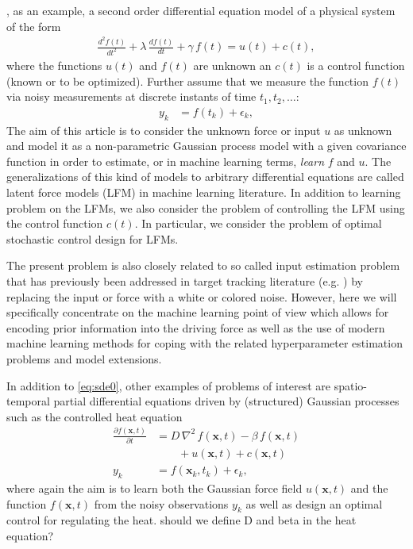 \documentclass[journal]{IEEEtran}
\newcommand{\mauricio}[1]{{\color{blue}#1}}
\begin{document}
, as an example, a second order differential equation model of a physical system of the form
%
\begin{equation}
\begin{split}
  \frac{d^{2}f(t)}{dt^{2}} + \lambda \, \frac{df(t)}{dt} + \gamma \, f(t) = u(t) + c(t),
\end{split}
\label{eq:sde0}
\end{equation}
%
where the functions $u(t)$ and $f(t)$ are unknown an $c(t)$ is a control function (known or to be optimized). Further assume that we measure the function $f(t)$ via noisy measurements at discrete instants of time $t_1,t_2,\ldots$:
%
\begin{equation}
\begin{split}
  y_k &= f(t_k) + \epsilon_k,
\end{split}
\end{equation}
%
The aim of this article is to consider the unknown force or input $u$ as unknown and model it as a non-parametric Gaussian process model \cite{Rasmussen+Williams:2006} with a given covariance function in order to estimate, or in machine learning terms, {\em learn} $f$ and $u$. The generalizations of this kind of models to arbitrary differential equations are called latent force models (LFM) \cite{Alvarez+Luengo+Lawrence:2009,Alvarez:2010,Alvarez+Luengo+Lawrence:2013,Hartikainen+Sarkka:2011,Hartikainen+Seppanen+Sarkka:2012} in machine learning literature. In addition to learning problem on the LFMs, we also consider the problem of controlling the LFM using the control function $c(t)$. In particular, we consider the problem of optimal stochastic control design for LFMs.

The present problem is also closely related to so called input estimation problem that has previously been addressed in target tracking literature (e.g. \cite{Bar-Shalom+Li+Kirubarajan:2001}) by replacing the input or force with a white or colored noise. However, here we will specifically concentrate on the machine learning point of view which allows for encoding prior information into the driving force as well as the use of modern machine learning methods for coping with the related hyperparameter estimation problems and model extensions. 

In addition to \eqref{eq:sde0}, other examples of problems of interest are spatio-temporal partial differential equations driven by (structured) Gaussian processes such as the controlled heat equation
%
\begin{equation}
\begin{split}
  \frac{\partial f(\mathbf{x},t)}{\partial t} &=
  D \, \nabla^2 \, f(\mathbf{x},t) - \beta \, f(\mathbf{x},t) \\
  &\qquad + u(\mathbf{x},t) + c(\mathbf{x},t) \\
  y_k &= f(\mathbf{x}_k,t_k) + \epsilon_k,
\end{split}
\label{eq:spde0}
\end{equation}
%
where again the aim is to learn both the Gaussian force field $u(\mathbf{x},t)$ and the function $f(\mathbf{x},t)$ from
the noisy observations $y_k$ as well as design an optimal control for \mauricio{regulating the heat. should we define D
  and beta in the heat equation?}
\end{document}
